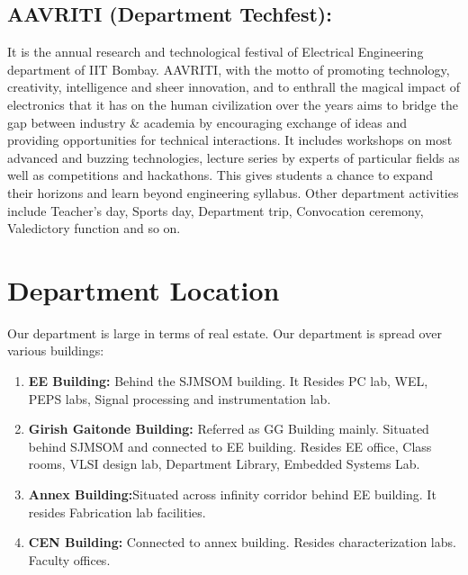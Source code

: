 \documentclass[11pt,fleqn,openany]{book} %
\begin{document}
\section {AAVRITI (Department Techfest):}
It is the annual research and technological festival of Electrical Engineering department of IIT Bombay. AAVRITI, with the motto of promoting technology, creativity, intelligence and sheer innovation, and to enthrall the magical impact of electronics that it has on the human civilization over the years aims to bridge the gap between industry \& academia by encouraging exchange of ideas and providing opportunities for technical interactions.\newline
It includes workshops on most advanced and buzzing technologies, lecture series by experts of particular fields as well as competitions and hackathons. This gives students a chance to expand their horizons and learn beyond engineering syllabus.\newline
Other department activities include Teacher’s day, Sports day, Department trip, Convocation ceremony, Valedictory function and so on.
\chapter{Department Location }
Our department is large in terms of real estate. Our department is spread over various buildings: \newline
\begin{enumerate}
    \item  \textbf{EE Building:} \newline  Behind the SJMSOM building. It Resides PC lab, WEL, PEPS labs, Signal processing and instrumentation lab.
    \item  \textbf{Girish Gaitonde Building:} \newline Referred as GG Building mainly. Situated behind SJMSOM and connected to EE building. Resides EE office, Class rooms, VLSI design lab, Department Library, Embedded Systems Lab.
    \item \textbf{Annex Building:}\newline  Situated across infinity corridor behind EE building. It resides Fabrication lab facilities.
    \item \textbf{CEN Building:} \newline Connected to annex building. Resides characterization labs. Faculty offices.
\end{enumerate}

\end{document}
